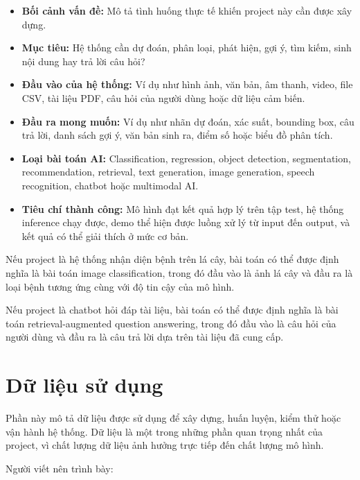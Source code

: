 \documentclass[12pt]{ai_conquer2026}
\begin{document}
\begin{itemize}
\item \textbf{Bối cảnh vấn đề:} Mô tả tình huống thực tế khiến project này cần được xây dựng.
\item \textbf{Mục tiêu:} Hệ thống cần dự đoán, phân loại, phát hiện, gợi ý, tìm kiếm, sinh nội dung hay trả lời câu hỏi?
\item \textbf{Đầu vào của hệ thống:} Ví dụ như hình ảnh, văn bản, âm thanh, video, file CSV, tài liệu PDF, câu hỏi của người dùng hoặc dữ liệu cảm biến.
\item \textbf{Đầu ra mong muốn:} Ví dụ như nhãn dự đoán, xác suất, bounding box, câu trả lời, danh sách gợi ý, văn bản sinh ra, điểm số hoặc biểu đồ phân tích.
\item \textbf{Loại bài toán AI:} Classification, regression, object detection, segmentation, recommendation, retrieval, text generation, image generation, speech recognition, chatbot hoặc multimodal AI.
\item \textbf{Tiêu chí thành công:} Mô hình đạt kết quả hợp lý trên tập test, hệ thống inference chạy được, demo thể hiện được luồng xử lý từ input đến output, và kết quả có thể giải thích ở mức cơ bản.
\end{itemize}

\begin{aivncodebox}[Ví dụ:]
Nếu project là hệ thống nhận diện bệnh trên lá cây, bài toán có thể được định nghĩa là bài toán image classification, trong đó đầu vào là ảnh lá cây và đầu ra là loại bệnh tương ứng cùng với độ tin cậy của mô hình.
\end{aivncodebox}

\begin{aivncodebox}[Ví dụ:]
Nếu project là chatbot hỏi đáp tài liệu, bài toán có thể được định nghĩa là bài toán retrieval-augmented question answering, trong đó đầu vào là câu hỏi của người dùng và đầu ra là câu trả lời dựa trên tài liệu đã cung cấp.
\end{aivncodebox}
\section{Dữ liệu sử dụng}

Phần này mô tả dữ liệu được sử dụng để xây dựng, huấn luyện, kiểm thử hoặc vận hành hệ thống. Dữ liệu là một trong những phần quan trọng nhất của project, vì chất lượng dữ liệu ảnh hưởng trực tiếp đến chất lượng mô hình.

Người viết nên trình bày:
\end{document}
